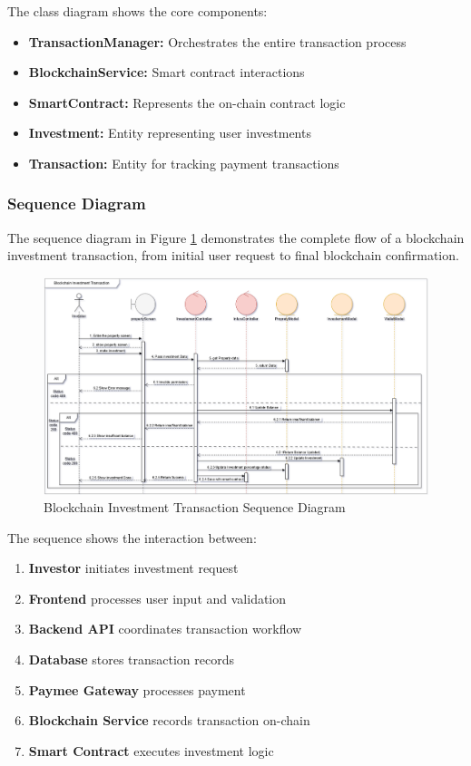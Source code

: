 The class diagram shows the core components:

\begin{itemize}
    \item \textbf{TransactionManager:} Orchestrates the entire transaction process
    \item \textbf{BlockchainService:}  Smart contract interactions
    \item \textbf{SmartContract:} Represents the on-chain contract logic
    \item \textbf{Investment:} Entity representing user investments
    \item \textbf{Transaction:} Entity for tracking payment transactions
\end{itemize}

\subsubsection{Sequence Diagram}

The sequence diagram in Figure \ref{fig:blockchain-sequence-diagram} demonstrates the complete flow of a blockchain investment transaction, from initial user request to final blockchain confirmation.
\newpage

\begin{figure}[htbp]
    \centering
    \includegraphics[width=1\textwidth]{images/blockchain_sequence_diagram.png}
    \caption{Blockchain Investment Transaction Sequence Diagram}
    \label{fig:blockchain-sequence-diagram}
\end{figure}

The sequence shows the interaction between:
\begin{enumerate}
    \item \textbf{Investor} initiates investment request
    \item \textbf{Frontend} processes user input and validation
    \item \textbf{Backend API} coordinates transaction workflow
    \item \textbf{Database} stores transaction records
    \item \textbf{Paymee Gateway} processes payment
    \item \textbf{Blockchain Service} records transaction on-chain
    \item \textbf{Smart Contract} executes investment logic
\end{enumerate}

